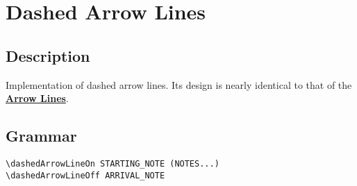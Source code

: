 \vfill \break


\section {Dashed Arrow Lines}
\hfill

\subsection{Description}
Implementation of dashed arrow lines. Its design is nearly identical to that of the \hyperref[sec:arrow_lines]{\textbf{Arrow Lines}}.
\subsection{Grammar}
\begin{verbatim}
\dashedArrowLineOn STARTING_NOTE (NOTES...)
\dashedArrowLineOff ARRIVAL_NOTE
\end{verbatim}

